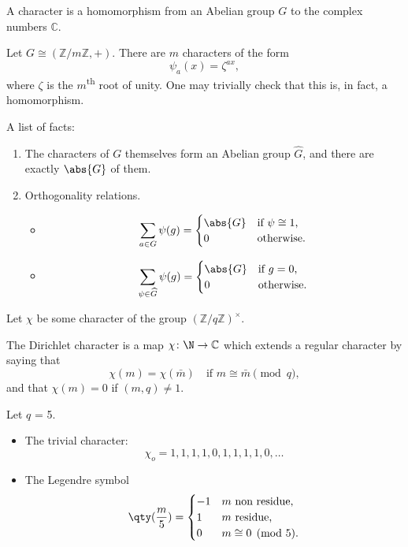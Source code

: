 \begin{definition}[Character]
	A character is a homomorphism from an Abelian group $G$ to the complex
	numbers $\mathbb{C}$.
\end{definition}

\begin{example}
	Let $G \cong (\mathbb{Z}/m\mathbb{Z}, +)$.
	There are $m$ characters of the form 
	\[ \psi_a(x) = \zeta^{ax}, \]
	where $\zeta$ is the $m$\textsuperscript{th} root of unity.
	One may trivially check that this is, in fact, a homomorphism.
\end{example}

A list of facts:

\begin{enumerate}
	\item The characters of $G$ themselves form an Abelian group $\widehat{G}$, 
	and there are exactly $\abs{G}$ of them.
	\item Orthogonality relations.
	\begin{itemize}
		\item \[ \sum_{a \in G} \psi(g) = \begin{cases}
			\abs{G} & \text{if $\psi \cong 1$,} \\
			0 & \text{otherwise}.
		\end{cases} \]
		\item \[ \sum_{\psi \in \widehat{G}} \psi(g) = \begin{cases}
			\abs{G} & \text{if $g = 0$,} \\
			0 & \text{otherwise}.
		\end{cases} \]
	\end{itemize}
\end{enumerate}

Let $\chi$ be some character of the group $(\mathbb{Z}/q\mathbb{Z})^\times$.

\begin{definition}
	The Dirichlet character is a map $\chi\colon \N \to \mathbb{C}$ which extends
	a regular character by saying that
	\[ \chi(m) = \chi(\bar{m}) \quad \text{if $m \cong \bar{m} \pmod{q}$}, \]
	and that $\chi(m) = 0$ if $(m,q) \not= 1$.
\end{definition}

\begin{example} Let $q$ = 5.
	\begin{itemize}
		\item The trivial character: 
		\[ \chi_o = 1,1,1,1,0,1,1,1,1,0,\dotsc \]
		\item The Legendre symbol
		\[ \qty(\frac{m}{5}) = \begin{cases}
			-1 & \text{$m$ non residue,} \\
			1 & \text{$m$ residue,} \\
			0 & \text{$m \cong 0 \pmod{5}$.}
		\end{cases} \]
	\end{itemize}
\end{example}

